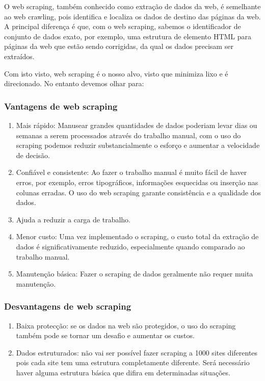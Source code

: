\documentclass[a4paper,10pt]{article}
\begin{document}
O web scraping, também conhecido como extração de dados da web, é semelhante ao web crawling, pois identifica e localiza os dados de destino das páginas da web.
A principal diferença é que, com o web scraping, sabemos o identificador de conjunto de dados exato, por exemplo, uma estrutura de elemento HTML para páginas da web que estão sendo corrigidas, da qual os dados precisam ser extraídos.

Com isto visto, web scraping é o nosso alvo, visto que minimiza lixo e é direcionado.
No entanto devemos olhar para:

\subsubsection{Vantagens de web scraping}

\begin{enumerate}
    \item Mais rápido: Manusear grandes quantidades de dados poderiam levar dias ou semanas a serem processados através do trabalho manual, com o uso do scraping podemos reduzir substancialmente o esforço e aumentar a velocidade de decisão.
    \item Confiável e consistente: Ao fazer o trabalho manual é muito fácil de haver erros, por exemplo, erros tipográficos, informações esquecidas ou inserção nas colunas erradas. O uso do web scraping garante consistência e a qualidade dos dados.
    \item Ajuda a reduzir a carga de trabalho.
    \item Menor custo: Uma vez implementado o scraping, o custo total da extração de dados é significativamente reduzido, especialmente quando comparado ao trabalho manual.
    \item Manutenção básica: Fazer o scraping de dados geralmente não requer muita manutenção.
\end{enumerate}

\subsubsection{Desvantagens de web scraping}

\begin{enumerate}
    \item Baixa protecção: se os dados na web são protegidos, o uso do scraping também pode se tornar um desafio e aumentar os custos.
    \item Dados estruturados: não vai ser possível fazer scraping a 1000 sites diferentes pois cada site tem uma estrutura completamente diferente.  Será necessário haver alguma estrutura básica que difira em determinadas situações.
\end{enumerate}
\end{document}
